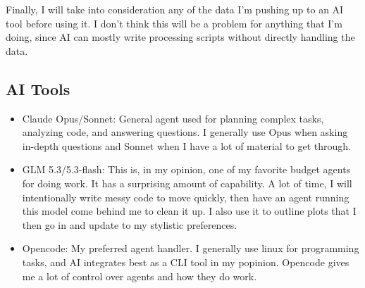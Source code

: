 Finally, I will take into consideration any of the data I'm pushing up to an AI tool before using it. I don't think this will be a problem for anything that I'm doing, since AI can mostly write processing scripts without directly handling the data.


\subsection{AI Tools}

\begin{itemize}
    \item Claude Opus/Sonnet: General agent used for planning complex tasks, analyzing code, and answering questions. I generally use Opus when asking in-depth questions and Sonnet when I have a lot of material to get through.
    \item GLM 5.3/5.3-flash: This is, in my opinion, one of my favorite budget agents for doing work. It has a surprising amount of capability. A lot of time, I will intentionally write messy code to move quickly, then have an agent running this model come behind me to clean it up. I also use it to outline plots that I then go in and update to my stylistic preferences.
    \item Opencode: My preferred agent handler. I generally use linux for programming tasks, and AI integrates best as a CLI tool in my popinion. Opencode gives me a lot of control over agents and how they do work.
\end{itemize}
